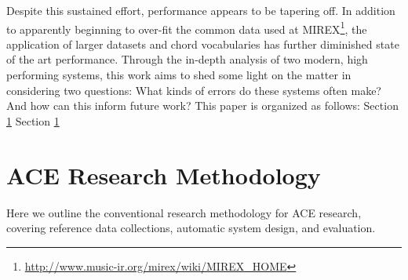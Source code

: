 \documentclass{article}
\begin{document}
Despite this sustained effort, performance appears to be tapering off.
In addition to apparently beginning to over-fit the common data used at MIREX\footnote{\url{http://www.music-ir.org/mirex/wiki/MIREX\_HOME}}, the application of larger datasets and chord vocabularies has further diminished state of the art performance.
Through the in-depth analysis of two modern, high performing systems, this work aims to shed some light on the matter in considering two questions:
What kinds of errors do these systems often make?
And how can this inform future work?
This paper is organized as follows:
Section \ref{}
Section \ref{}


\section{ACE Research Methodology}

Here we outline the conventional research methodology for ACE research, covering reference data collections, automatic system design, and evaluation.





\end{document}
